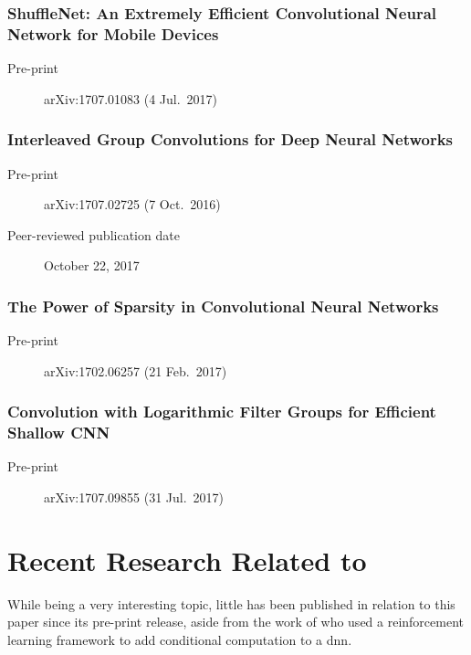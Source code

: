 \documentclass[thesis]{subfiles}
\begin{document}
\subsubsection*{ShuffleNet: An Extremely Efficient Convolutional
Neural Network for Mobile Devices}
\begin{description}
    \item[Pre-print] arXiv:1707.01083 (4 Jul.\ 2017)
\end{description}
\citet{zhang2017shufflenet}

\subsubsection*{Interleaved Group Convolutions for Deep Neural Networks}
\begin{description}
    \item[Pre-print] arXiv:1707.02725 (7 Oct.\ 2016)
    \item[Peer-reviewed publication date] October 22, 2017
\end{description}
\citet{zhang2017primal}

\subsubsection*{The Power of Sparsity in Convolutional Neural Networks}
\begin{description}
    \item[Pre-print] arXiv:1702.06257 (21 Feb.\ 2017)
\end{description}
\citet{changpinyo2017power}


\subsubsection*{Convolution with Logarithmic Filter Groups for Efficient Shallow {CNN}}
\begin{description}
    \item[Pre-print] arXiv:1707.09855 (31 Jul.\ 2017)
\end{description}
\citet{Lee2017}

\section{Recent Research Related to }
While being a very interesting topic, little has been published in relation to this paper since its pre-print release, aside from the work of \citet{BengioE2015} who used a reinforcement learning framework to add conditional computation to a \gls{dnn}. 
\end{document}
